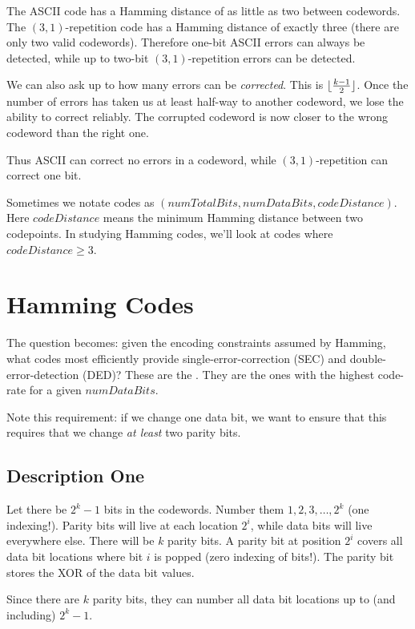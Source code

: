 \documentclass[11pt, oneside]{amsart}
\begin{document}
The ASCII code has a Hamming distance of as little as two between
codewords. The $(3, 1)$-repetition code has a Hamming distance of
exactly three (there are only two valid codewords). Therefore one-bit
ASCII errors can always be detected, while up to two-bit $(3,
1)$-repetition errors can be detected.

We can also ask up to how many errors can be \emph{corrected}. This is
$\lfloor\frac{k-1}{2}\rfloor$. Once the number of errors has taken us at least
half-way to another codeword, we lose the ability to correct reliably.
The corrupted codeword is now closer to the wrong codeword than the
right one.

Thus ASCII can correct no errors in a codeword, while $(3,
1)$-repetition can correct one bit.

Sometimes we notate codes as $(\textit{numTotalBits},
\textit{numDataBits}, \textit{codeDistance})$. Here
$\textit{codeDistance}$ means the minimum Hamming distance between two
codepoints. In studying Hamming codes, we'll look at codes where
$\textit{codeDistance} \geq 3$.

\section{Hamming Codes}

The question becomes: given the encoding constraints assumed by Hamming,
what codes most efficiently provide single-error-correction (SEC) and
double-error-detection (DED)? These are the . They
are the ones with the highest code-rate for a given
$\textit{numDataBits}$.

Note this requirement: if we change one data bit, we want to ensure that
this requires that we change \emph{at least} two parity bits.

\subsection{Description One}

Let there be $2^k - 1$ bits in the codewords. Number them $1, 2, 3,
\ldots, 2^k$ (one indexing!). Parity bits will live at each location
$2^i$, while data bits will live everywhere else. There will be $k$
parity bits. A parity bit at position $2^i$ covers all data bit
locations where bit $i$ is popped (zero indexing of bits!). The parity
bit stores the XOR of the data bit values.

Since there are $k$ parity bits, they can number all data bit locations
up to (and including) $2^k - 1$.
\end{document}
